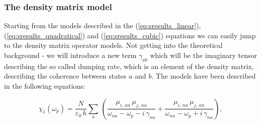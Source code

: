 \documentclass[12pt,twoside,a4paper]{article}
\numberwithin{equation}{subsection}
\numberwithin{figure}{subsection}
\begin{document}
\subsubsection*{The density matrix model}

Starting from the models described in the (\ref{eq:sresults_linear}), (\ref{eq:sresults_quadratical}) and (\ref{eq:sresults_cubic})
equations we can easily jump to the density matrix operator models. Not getting into the theoretical background - we will introduce a new
term $\gamma_{ab}$ which will be the imaginary tensor describing the so called dumping rate, which is an element of the density matrix,
describing the coherence between states $a$ and $b$. The models have been described in the following equations:

\begin{equation} \label{eq:ssmods_linear}
    {\chi_{1}}({\omega_{p}}) = \frac {N}{{\varepsilon_{0}}\,h}\sum_{n}\,(\frac {{\mu_{i, \,an}}\,{\mu_{j, \,na}}}{{\omega_{na}} -
    {\omega_{p}} - i\,{\gamma_{na}}} + \frac {{\mu_{i, \,na}}\,{\mu_{j, \,an}}}{{\omega_{na}} - {\omega_{p}} + i\,{\gamma_{na}}}),
\end{equation}
\end{document}
